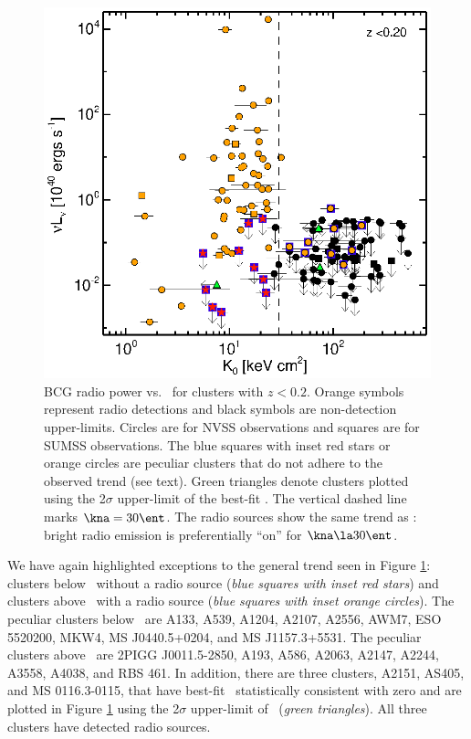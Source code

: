\begin{figure}
  \begin{center}
    \includegraphics*[width=\columnwidth, trim=28mm 7mm 40mm 17mm, clip]{haradent_f2.eps}
    \caption[BCG radio power versus core entropy]{BCG radio power
    vs. \kna\ for clusters with $z < 0.2$. Orange symbols represent
    radio detections and black symbols are non-detection
    upper-limits. Circles are for NVSS observations and squares are
    for SUMSS observations. The blue squares with inset red stars or
    orange circles are peculiar clusters that do not adhere to the
    observed trend (see text).  Green triangles denote clusters
    plotted using the 2$\sigma$ upper-limit of the best-fit \kna. The
    vertical dashed line marks $\kna = 30 \ent$. The radio sources
    show the same trend as \halpha: bright radio emission is
    preferentially ``on'' for $\kna \la 30 \ent$.}
    \label{fig:radzcut}
  \end{center}
\end{figure}

We have again highlighted exceptions to the general trend seen in
Figure \ref{fig:radzcut}: clusters below \kthr\ without a radio source
({\it{blue squares with inset red stars}}) and clusters above \kthr\
with a radio source ({\it{blue squares with inset orange
circles}}). The peculiar clusters below \kthr\ are A133, A539, A1204,
A2107, A2556, AWM7, ESO 5520200, MKW4, MS J0440.5+0204, and MS
J1157.3+5531. The peculiar clusters above \kthr\ are 2PIGG
J0011.5-2850, A193, A586, A2063, A2147, A2244, A3558, A4038, and RBS
461. In addition, there are three clusters, A2151, AS405, and MS
0116.3-0115, that have best-fit \kna\ statistically consistent with
zero and are plotted in Figure \ref{fig:radzcut} using the 2$\sigma$
upper-limit of \kna\ ({\it{green triangles}}). All three clusters have
detected radio sources.

